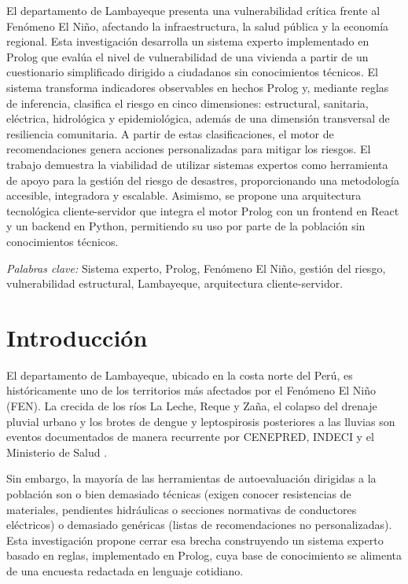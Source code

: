 \documentclass[12pt, letterpaper]{article}
\begin{document}
\noindent El departamento de Lambayeque presenta una vulnerabilidad crítica frente al Fenómeno El Niño, afectando la infraestructura, la salud pública y la economía regional. Esta investigación desarrolla un sistema experto implementado en Prolog que evalúa el nivel de vulnerabilidad de una vivienda a partir de un cuestionario simplificado dirigido a ciudadanos sin conocimientos técnicos. El sistema transforma indicadores observables en hechos Prolog y, mediante reglas de inferencia, clasifica el riesgo en cinco dimensiones: estructural, sanitaria, eléctrica, hidrológica y epidemiológica, además de una dimensión transversal de resiliencia comunitaria. A partir de estas clasificaciones, el motor de recomendaciones genera acciones personalizadas para mitigar los riesgos. El trabajo demuestra la viabilidad de utilizar sistemas expertos como herramienta de apoyo para la gestión del riesgo de desastres, proporcionando una metodología accesible, integradora y escalable. Asimismo, se propone una arquitectura tecnológica cliente-servidor que integra el motor Prolog con un frontend en React y un backend en Python, permitiendo su uso por parte de la población sin conocimientos técnicos.

\vspace{1cm}
\noindent\hspace{0.5in}\textit{Palabras clave:} Sistema experto, Prolog, Fenómeno El Niño, gestión del riesgo, vulnerabilidad estructural, Lambayeque, arquitectura cliente-servidor.

\newpage
\tableofcontents
\newpage
\listoffigures
\listoftables
\thispagestyle{fancy}

\newpage
\section{Introducción}

El departamento de Lambayeque, ubicado en la costa norte del Perú, es históricamente uno de los territorios más afectados por el Fenómeno El Niño (FEN). La crecida de los ríos La Leche, Reque y Zaña, el colapso del drenaje pluvial urbano y los brotes de dengue y leptospirosis posteriores a las lluvias son eventos documentados de manera recurrente por CENEPRED, INDECI y el Ministerio de Salud \parencite{gob_regional_lambayeque_2023, cenepred_manual_evar, minsa_alerta_2023}.

Sin embargo, la mayoría de las herramientas de autoevaluación dirigidas a la población son o bien demasiado técnicas (exigen conocer resistencias de materiales, pendientes hidráulicas o secciones normativas de conductores eléctricos) o demasiado genéricas (listas de recomendaciones no personalizadas). Esta investigación propone cerrar esa brecha construyendo un sistema experto basado en reglas, implementado en Prolog, cuya base de conocimiento se alimenta de una encuesta redactada en lenguaje cotidiano.
\end{document}
